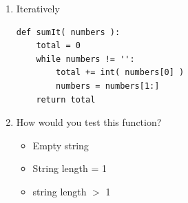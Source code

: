 \documentclass[11pt]{article}
\newenvironment{answer}{\large\lstset{basicstyle=\large}\color{white}}{}
\newenvironment{answer}{\large\lstset{basicstyle=\large}\color{red}}{}
\begin{document}
\begin{enumerate}
\begin{enumerate}
            \item Iteratively
\begin{answer}
\begin{lstlisting}
def sumIt( numbers ):
    total = 0
    while numbers != '':
        total += int( numbers[0] )
        numbers = numbers[1:]
    return total
\end{lstlisting}
\end{answer}
            \item How would you test this function?
                \begin{answer}
                \begin{itemize}
                    \item Empty string 
                    \item String length = 1
                    \item string length $>$ 1
                \end{itemize}
                \end{answer}


\end{enumerate}
\end{enumerate}
\end{document}
